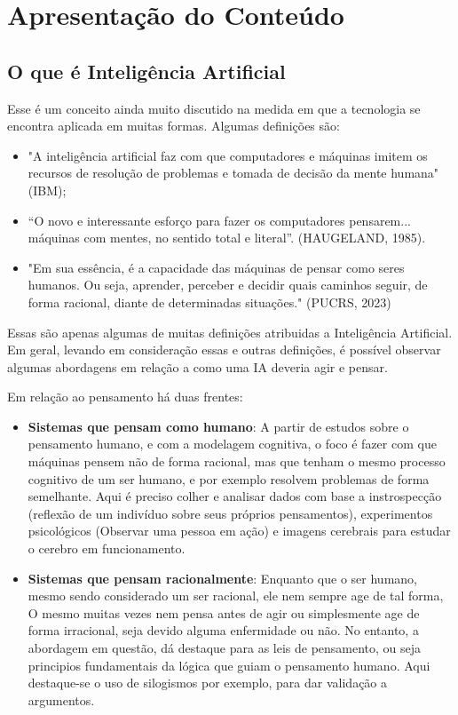 \documentclass[a4paper,12pt]{article}
\begin{document}
\section{Apresentação do Conteúdo}
\subsection{O que é Inteligência Artificial}
Esse é um conceito ainda muito discutido na medida em que a tecnologia se encontra aplicada em muitas formas. Algumas definições são:

\begin{itemize}
    \item "A inteligência artificial faz com que computadores e máquinas imitem os recursos de resolução de problemas e tomada de decisão da mente humana" (IBM);

    \item “O novo e interessante esforço para fazer os computadores pensarem... máquinas com mentes, no sentido total e literal”. (HAUGELAND, 1985). 

    \item "Em sua essência, é a capacidade das máquinas de pensar como seres humanos. Ou seja, aprender, perceber e decidir quais caminhos seguir, de forma racional, diante de determinadas situações." (PUCRS, 2023)
    
\end{itemize}

Essas são apenas algumas de muitas definições atribuidas a Inteligência Artificial. Em geral, levando em consideração essas e outras definições, é possível observar algumas abordagens em relação a como uma IA deveria agir e pensar.

Em relação ao pensamento há duas frentes:

\begin{itemize}
    \item \textbf{Sistemas que pensam como humano}: A partir de estudos sobre o pensamento humano, e com a modelagem cognitiva, o foco é fazer com que máquinas pensem não de forma racional, mas que tenham o mesmo processo cognitivo de um ser humano, e por exemplo resolvem problemas de forma semelhante. Aqui é preciso colher e analisar dados com base a instrospecção (reflexão de um indivíduo sobre seus próprios pensamentos), experimentos psicológicos (Observar uma pessoa em ação) e imagens cerebrais para estudar o cerebro em funcionamento. 

    \item \textbf{Sistemas que pensam racionalmente}: Enquanto que o ser humano, mesmo sendo considerado um ser racional, ele nem sempre age de tal forma, O mesmo muitas vezes nem pensa antes de agir ou simplesmente age de forma irracional, seja devido alguma enfermidade ou não. No entanto, a abordagem em questão, dá destaque para as leis de pensamento, ou seja principios fundamentais da lógica que guiam o pensamento humano. Aqui destaque-se o uso de silogismos por exemplo, para dar validação a argumentos.

\end{itemize}
\end{document}
